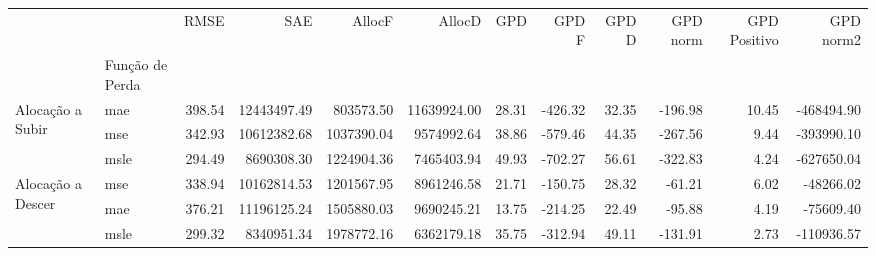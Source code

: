 \begin{tabular}{llrrrrrrrrrr}
\toprule
 &  & RMSE & SAE & AllocF & AllocD & GPD & GPD F & GPD D & GPD norm & GPD Positivo & GPD norm2 \\
 & Função de Perda &  &  &  &  &  &  &  &  &  &  \\
\midrule
\multirow[t]{3}{*}{Alocação a Subir} & mae & 398.54 & 12443497.49 & 803573.50 & 11639924.00 & 28.31 & -426.32 & 32.35 & -196.98 & 10.45 & -468494.90 \\
 & mse & 342.93 & 10612382.68 & 1037390.04 & 9574992.64 & 38.86 & -579.46 & 44.35 & -267.56 & 9.44 & -393990.10 \\
 & msle & 294.49 & 8690308.30 & 1224904.36 & 7465403.94 & 49.93 & -702.27 & 56.61 & -322.83 & 4.24 & -627650.04 \\
\cline{1-12}
\multirow[t]{3}{*}{Alocação a Descer} & mse & 338.94 & 10162814.53 & 1201567.95 & 8961246.58 & 21.71 & -150.75 & 28.32 & -61.21 & 6.02 & -48266.02 \\
 & mae & 376.21 & 11196125.24 & 1505880.03 & 9690245.21 & 13.75 & -214.25 & 22.49 & -95.88 & 4.19 & -75609.40 \\
 & msle & 299.32 & 8340951.34 & 1978772.16 & 6362179.18 & 35.75 & -312.94 & 49.11 & -131.91 & 2.73 & -110936.57 \\
\cline{1-12}
\bottomrule
\end{tabular}
